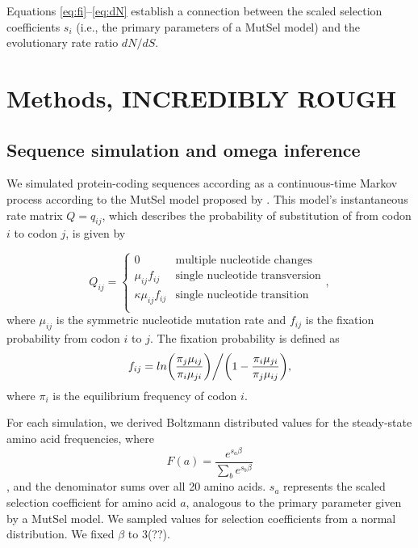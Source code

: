 \documentclass[11pt]{article}
\begin{document}
Equations \eqref{eq:fi}--\eqref{eq:dN} establish a connection between the scaled selection coefficients $s_i$ (i.e., the primary parameters of a MutSel model) and the evolutionary rate ratio $dN/dS$. 


\section*{Methods, INCREDIBLY ROUGH}

\subsection*{Sequence simulation and omega inference}
We simulated protein-coding sequences according as a continuous-time Markov
process according to the MutSel model proposed by \cite{HalpernBruno1998}. This model's instantaneous rate matrix $Q = q_{ij}$, which describes the probability of substitution of from codon $i$ to codon $j$, is given by 

\begin{equation}
Q_{ij} = \left\{ \begin{array}{rl}
              0                                           &\mbox{multiple nucleotide changes} \\
              \mu_{ij}f_{ij}                          &\mbox{single nucleotide transversion} \\
              \kappa\mu_{ij}f_{ij}               &\mbox{single nucleotide transition} \\
         \end{array} \right.,
\end{equation} where $\mu_{ij}$ is the symmetric nucleotide mutation rate and $f_{ij}$ is the fixation probability from codon $i$ to $j$. The fixation probability is defined as \begin{equation}f_{ij} = ln\bigg{(}\frac{\pi_j\mu_{ij}}{\pi_i\mu_{ji}}\bigg{)}\bigg{/}\bigg{(}1 - \frac{\pi_i\mu_{ji}}{\pi_j\mu_{ij}}\bigg{)},\end{equation} where $\pi_i$ is the equilibrium frequency of codon $i$.

For each simulation, we derived Boltzmann distributed values for the steady-state amino acid frequencies, where
\begin{equation} F(a) = \frac{e^{s_a\beta}}{\sum_b e^{s_b\beta}} \end{equation}, and the denominator sums over all 20 amino acids. $s_a$ represents the scaled selection coefficient for amino acid $a$, analogous to the primary parameter given by a MutSel model. We sampled values for selection coefficients from a normal distribution. We fixed $\beta$ to 3(??). 
  
\end{document}
